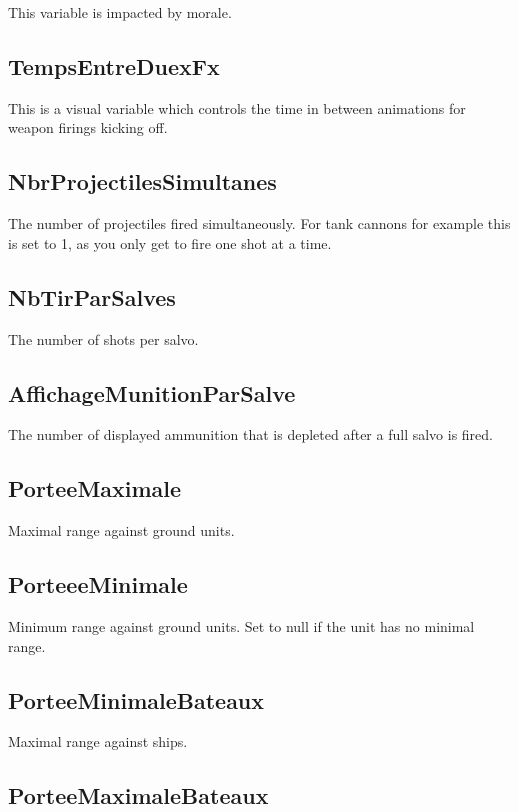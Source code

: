 \documentclass{article}
\begin{document}
This variable is impacted by morale.

\subsection{TempsEntreDuexFx}

This is a visual variable which controls the time in between animations for weapon firings kicking off.

\subsection{NbrProjectilesSimultanes}

The number of projectiles fired simultaneously. For tank cannons for example this is set to 1, as you only get to fire one shot at a time.

\subsection{NbTirParSalves}

The number of shots per salvo.

\subsection{AffichageMunitionParSalve}

The number of displayed ammunition that is depleted after a full salvo is fired.

\subsection{PorteeMaximale}

Maximal range against ground units.

\subsection{PorteeeMinimale}

Minimum range against ground units. Set to null if the unit has no minimal range.

\subsection{PorteeMinimaleBateaux}

Maximal range against ships.

\subsection{PorteeMaximaleBateaux}
\end{document}
